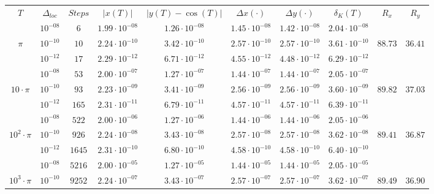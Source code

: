 \documentclass[a4paper,12pt]{article}
\begin{document}
\begin{table}[H]
\begin{tabular}{|c|c|c|c|c|c|c|c|c|c|}
    \hline
    $T$&$\Delta_{loc}$&$Steps$&$|x(T)|$&$|y(T)-\cos(T)|$&$\Delta x(\cdot)$&$\Delta y(\cdot)$&$\delta_K(T)$&$R_x$&$R_y$\\
    \cline{1-10}
    &$ 10^{-08} $&$  6  $&$ 1.99\cdot 10^{-08} $&$ 1.26\cdot 10^{-08} $&$ 1.45\cdot 10^{-08} $&$ 1.42\cdot 10^{-08} $&$ 2.04\cdot 10^{-08} $&$ $& \\
    \cline{2-8}
    $\pi $&$ 10^{-10} $&$ 10 $&$ 2.24\cdot 10^{-10} $&$ 3.42\cdot 10^{-10} $&$ 2.57\cdot 10^{-10} $&$ 2.57\cdot 10^{-10} $&$ 3.61\cdot 10^{-10} $&$ 88.73 $&$ 36.41 $\\
    \cline{2-8}
    &$ 10^{-12} $&$ 17 $&$ 2.29\cdot 10^{-12} $&$ 6.71\cdot 10^{-12} $&$ 4.55\cdot 10^{-12} $&$ 4.48\cdot 10^{-12} $&$ 6.29\cdot 10^{-12} $&$ $& \\
    \cline{1-10}
    &$ 10^{-08} $&$ 53 $&$ 2.00\cdot 10^{-07} $&$ 1.27\cdot 10^{-07} $&$ 1.44\cdot 10^{-07} $&$ 1.44\cdot 10^{-07} $&$ 2.05\cdot 10^{-07} $&$ $&\\
    \cline{2-8}
    $10\cdot \pi $&$ 10^{-10} $&$ 93 $&$ 2.23\cdot 10^{-09} $&$ 3.41\cdot 10^{-09} $&$ 2.56\cdot 10^{-09} $&$ 2.56\cdot 10^{-09} $&$ 3.60\cdot 10^{-09} $&$89.82$&$37.03$\\
    \cline{2-8}
    &$ 10^{-12} $&$ 165 $&$ 2.31\cdot 10^{-11} $&$ 6.79\cdot 10^{-11} $&$ 4.57\cdot 10^{-11} $&$ 4.57\cdot 10^{-11} $&$ 6.39\cdot 10^{-11} $&$ $&\\
    \cline{1-10}
    &$10^{-08}$&$ 522$&$ 2.00\cdot 10^{-06}$&$  1.27\cdot 10^{-06}$&$  1.44\cdot 10^{-06}$&$  1.44\cdot 10^{-06}$&$  2.05\cdot 10^{-06}$&&\\
    \cline{2-8}
    $10^2 \cdot \pi$&$10^{-10}$&$ 926$&$ 2.24\cdot 10^{-08}$&$  3.43\cdot 10^{-08}$&$  2.57\cdot 10^{-08}$&$  2.57\cdot 10^{-08}$&$  3.62\cdot 10^{-08}$&$89.41$&$36.87$\\ 
    \cline{2-8}
    &$10^{-12}$&$ 1645$&$ 2.31\cdot 10^{-10}$&$  6.80\cdot 10^{-10}$&$  4.58\cdot 10^{-10}$&$  4.58\cdot 10^{-10}$&$  6.40\cdot 10^{-10}$&&\\
    \cline{1-10}
    &$10^{-08}$&$ 5216$&$  2.00\cdot 10^{-05}$&$  1.27\cdot 10^{-05}$&$  1.44\cdot 10^{-05}$&$  1.44\cdot 10^{-05}$&$  2.05\cdot 10^{-05}$& &\\
    \cline{2-8}
    $10^3 \cdot \pi$&$10^{-10}$&$ 9252$&$  2.24\cdot 10^{-07}$&$  3.43\cdot 10^{-07}$&$  2.57\cdot 10^{-07}$&$  2.57\cdot 10^{-07}$&$  3.62\cdot 10^{-07}$&$89.49$&$36.90$\\ 

\end{tabular}
\end{table}
\end{document}
